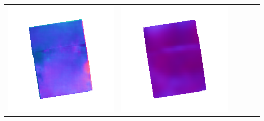 \begin{tabularx}{\linewidth}{@{}Y@{}Y@{}Y@{}Y@{}Y@{}Y@{}}
\includegraphics[width=\linewidth]{semisynthetic/20160617_0_marrnet_out.png} &
\includegraphics[width=\linewidth]{semisynthetic/20160617_0_ef_out.png} \\

\end{tabularx}
